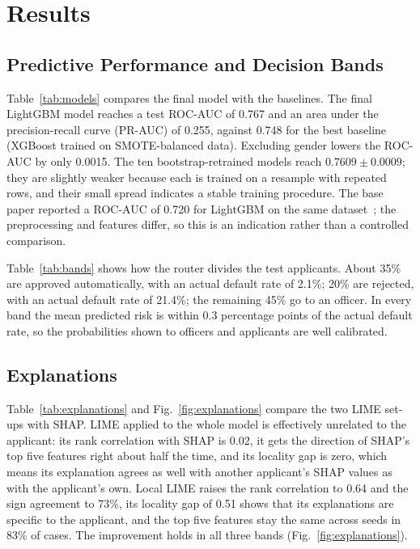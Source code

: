 \section{Results}
\label{sec:results}

\subsection{Predictive Performance and Decision Bands}
Table~\ref{tab:models} compares the final model with the baselines. The final LightGBM model reaches a test ROC-AUC
of 0.767 and an area under the precision-recall curve (PR-AUC) of 0.255, against 0.748 for the best baseline (XGBoost trained on SMOTE-balanced data). Excluding
gender lowers the ROC-AUC by only 0.0015. The ten bootstrap-retrained models reach $0.7609 \pm 0.0009$; they are
slightly weaker because each is trained on a resample with repeated rows, and their small spread indicates a stable
training procedure. The base paper reported a ROC-AUC of 0.720 for LightGBM on the same dataset~\cite{shreya2025base};
the preprocessing and features differ, so this is an indication rather than a controlled comparison.



Table~\ref{tab:bands} shows how the router divides the test applicants. About 35\% are approved automatically, with an
actual default rate of 2.1\%; 20\% are rejected, with an actual default rate of 21.4\%; the remaining 45\% go to an
officer. In every band the mean predicted risk is within 0.3 percentage points of the actual default rate, so the
probabilities shown to officers and applicants are well calibrated.



\subsection{Explanations}
Table~\ref{tab:explanations} and Fig.~\ref{fig:explanations} compare the two LIME set-ups with SHAP. LIME applied to
the whole model is effectively unrelated to the applicant: its rank correlation with SHAP is 0.02, it gets the
direction of SHAP's top five features right about half the time, and its locality gap is zero, which means its
explanation agrees as well with another applicant's SHAP values as with the applicant's own. Local LIME raises the
rank correlation to 0.64 and the sign agreement to 73\%, its locality gap of 0.51 shows that its explanations are
specific to the applicant, and the top five features stay the same across seeds in 83\% of cases. The improvement holds
in all three bands (Fig.~\ref{fig:explanations}).

